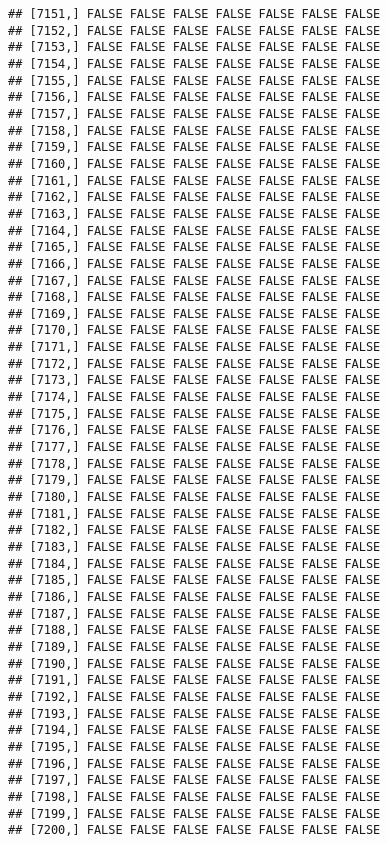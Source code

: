\documentclass[
]{article}
\begin{document}
\begin{verbatim}
## [7151,] FALSE FALSE FALSE FALSE FALSE FALSE FALSE
## [7152,] FALSE FALSE FALSE FALSE FALSE FALSE FALSE
## [7153,] FALSE FALSE FALSE FALSE FALSE FALSE FALSE
## [7154,] FALSE FALSE FALSE FALSE FALSE FALSE FALSE
## [7155,] FALSE FALSE FALSE FALSE FALSE FALSE FALSE
## [7156,] FALSE FALSE FALSE FALSE FALSE FALSE FALSE
## [7157,] FALSE FALSE FALSE FALSE FALSE FALSE FALSE
## [7158,] FALSE FALSE FALSE FALSE FALSE FALSE FALSE
## [7159,] FALSE FALSE FALSE FALSE FALSE FALSE FALSE
## [7160,] FALSE FALSE FALSE FALSE FALSE FALSE FALSE
## [7161,] FALSE FALSE FALSE FALSE FALSE FALSE FALSE
## [7162,] FALSE FALSE FALSE FALSE FALSE FALSE FALSE
## [7163,] FALSE FALSE FALSE FALSE FALSE FALSE FALSE
## [7164,] FALSE FALSE FALSE FALSE FALSE FALSE FALSE
## [7165,] FALSE FALSE FALSE FALSE FALSE FALSE FALSE
## [7166,] FALSE FALSE FALSE FALSE FALSE FALSE FALSE
## [7167,] FALSE FALSE FALSE FALSE FALSE FALSE FALSE
## [7168,] FALSE FALSE FALSE FALSE FALSE FALSE FALSE
## [7169,] FALSE FALSE FALSE FALSE FALSE FALSE FALSE
## [7170,] FALSE FALSE FALSE FALSE FALSE FALSE FALSE
## [7171,] FALSE FALSE FALSE FALSE FALSE FALSE FALSE
## [7172,] FALSE FALSE FALSE FALSE FALSE FALSE FALSE
## [7173,] FALSE FALSE FALSE FALSE FALSE FALSE FALSE
## [7174,] FALSE FALSE FALSE FALSE FALSE FALSE FALSE
## [7175,] FALSE FALSE FALSE FALSE FALSE FALSE FALSE
## [7176,] FALSE FALSE FALSE FALSE FALSE FALSE FALSE
## [7177,] FALSE FALSE FALSE FALSE FALSE FALSE FALSE
## [7178,] FALSE FALSE FALSE FALSE FALSE FALSE FALSE
## [7179,] FALSE FALSE FALSE FALSE FALSE FALSE FALSE
## [7180,] FALSE FALSE FALSE FALSE FALSE FALSE FALSE
## [7181,] FALSE FALSE FALSE FALSE FALSE FALSE FALSE
## [7182,] FALSE FALSE FALSE FALSE FALSE FALSE FALSE
## [7183,] FALSE FALSE FALSE FALSE FALSE FALSE FALSE
## [7184,] FALSE FALSE FALSE FALSE FALSE FALSE FALSE
## [7185,] FALSE FALSE FALSE FALSE FALSE FALSE FALSE
## [7186,] FALSE FALSE FALSE FALSE FALSE FALSE FALSE
## [7187,] FALSE FALSE FALSE FALSE FALSE FALSE FALSE
## [7188,] FALSE FALSE FALSE FALSE FALSE FALSE FALSE
## [7189,] FALSE FALSE FALSE FALSE FALSE FALSE FALSE
## [7190,] FALSE FALSE FALSE FALSE FALSE FALSE FALSE
## [7191,] FALSE FALSE FALSE FALSE FALSE FALSE FALSE
## [7192,] FALSE FALSE FALSE FALSE FALSE FALSE FALSE
## [7193,] FALSE FALSE FALSE FALSE FALSE FALSE FALSE
## [7194,] FALSE FALSE FALSE FALSE FALSE FALSE FALSE
## [7195,] FALSE FALSE FALSE FALSE FALSE FALSE FALSE
## [7196,] FALSE FALSE FALSE FALSE FALSE FALSE FALSE
## [7197,] FALSE FALSE FALSE FALSE FALSE FALSE FALSE
## [7198,] FALSE FALSE FALSE FALSE FALSE FALSE FALSE
## [7199,] FALSE FALSE FALSE FALSE FALSE FALSE FALSE
## [7200,] FALSE FALSE FALSE FALSE FALSE FALSE FALSE

\end{verbatim}
\end{document}
